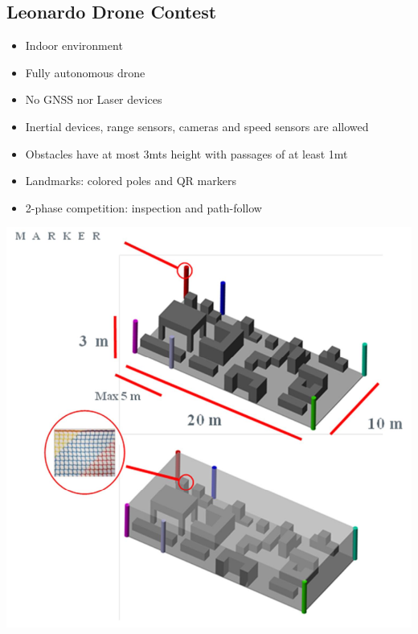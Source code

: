 \documentclass[serif]{beamer}
\begin{document}
    \subsection*{Leonardo Drone Contest}
    \begin{frame}
       \begin{itemize}
           \item{Indoor environment}
           \item{Fully autonomous drone}
           \item{No GNSS nor Laser devices}
           \item{Inertial devices, range sensors, cameras and speed sensors are allowed}
           \item{Obstacles
have at most 3mts height with passages of at least 1mt}
           \item{Landmarks: colored poles and QR markers}
           \item{2-phase competition: inspection and path-follow}
       \end{itemize}
    \end{frame}
    \begin{frame}
        \centering
        \includegraphics[width=0.6\linewidth]{Images/fig25-contest-env.png}
    \end{frame}
\end{document}
